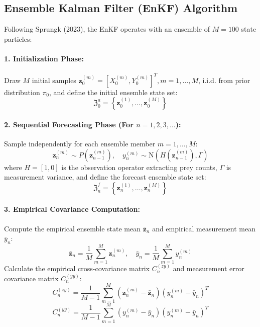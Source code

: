 \documentclass[11pt,a4paper]{article}
\begin{document}
\subsection{Ensemble Kalman Filter (EnKF) Algorithm}
Following Sprungk (2023), the EnKF operates with an ensemble of $M = 100$ state particles:

\paragraph{1. Initialization Phase:}
Draw $M$ initial samples $\mathbf{z}_0^{(m)} = [X_0^{(m)}, Y_0^{(m)}]^T, m = 1, \dots, M$, i.i.d. from prior distribution $\pi_0$, and define the initial ensemble state set:
\begin{equation}
\mathfrak{Z}_0^a = \left\{ \mathbf{z}_0^{(1)}, \dots, \mathbf{z}_0^{(M)} \right\}
\end{equation}

\paragraph{2. Sequential Forecasting Phase (For $n = 1, 2, 3, \dots$):}
Sample independently for each ensemble member $m = 1, \dots, M$:
\begin{equation}
\mathbf{z}_n^{(m)} \sim P(\mathbf{z}_{n-1}^{(m)}), \quad y_n^{(m)} \sim \mathrm{N}(H(\mathbf{z}_{n-1}^{(m)}), \Gamma)
\end{equation}
where $H = [1, 0]$ is the observation operator extracting prey counts, $\Gamma$ is measurement variance, and define the forecast ensemble state set:
\begin{equation}
\mathfrak{Z}_n^f = \left\{ \mathbf{z}_n^{(1)}, \dots, \mathbf{z}_n^{(M)} \right\}
\end{equation}

\paragraph{3. Empirical Covariance Computation:}
Compute the empirical ensemble state mean $\bar{\mathbf{z}}_n$ and empirical measurement mean $\bar{y}_n$:
\begin{equation}
\bar{\mathbf{z}}_n = \frac{1}{M} \sum_{m=1}^M \mathbf{z}_n^{(m)}, \quad \bar{y}_n = \frac{1}{M} \sum_{m=1}^M y_n^{(m)}
\end{equation}
Calculate the empirical cross-covariance matrix $C_n^{(zy)}$ and measurement error covariance matrix $C_n^{(yy)}$:
\begin{equation}
C_n^{(zy)} = \frac{1}{M-1} \sum_{m=1}^M \left(\mathbf{z}_n^{(m)} - \bar{\mathbf{z}}_n\right) \left(y_n^{(m)} - \bar{y}_n\right)^T
\end{equation}
\begin{equation}
C_n^{(yy)} = \frac{1}{M-1} \sum_{m=1}^M \left(y_n^{(m)} - \bar{y}_n\right) \left(y_n^{(m)} - \bar{y}_n\right)^T
\end{equation}
\end{document}
